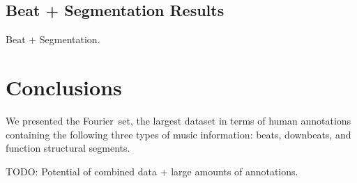 \documentclass{article}
\newcommand{\setName}{Fourier}
\begin{document}
\subsection{Beat + Segmentation Results}

Beat + Segmentation.

\section{Conclusions}\label{sec:conclusions}

We presented the \setName~set, the largest dataset in terms of human annotations containing the following three types of music information: beats, downbeats, and function structural segments.

TODO: Potential of combined data + large amounts of annotations.


\end{document}
